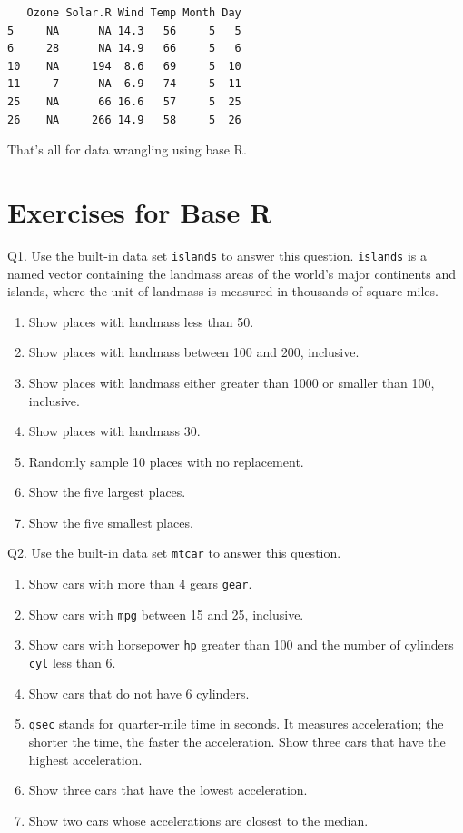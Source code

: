 \documentclass[
  letterpaper,
  DIV=11,
  numbers=noendperiod]{scrreprt}
\begin{document}
\begin{verbatim}
   Ozone Solar.R Wind Temp Month Day
5     NA      NA 14.3   56     5   5
6     28      NA 14.9   66     5   6
10    NA     194  8.6   69     5  10
11     7      NA  6.9   74     5  11
25    NA      66 16.6   57     5  25
26    NA     266 14.9   58     5  26
\end{verbatim}

That's all for data wrangling using base R.

\section{Exercises for Base R}\label{exercises-for-base-r}

Q1. Use the built-in data set \texttt{islands} to answer this question.
\texttt{islands} is a named vector containing the landmass areas of the
world's major continents and islands, where the unit of landmass is
measured in thousands of square miles.

\begin{enumerate}
\def\labelenumi{\alph{enumi}.}
\item
  Show places with landmass less than 50.
\item
  Show places with landmass between 100 and 200, inclusive.
\item
  Show places with landmass either greater than 1000 or smaller than
  100, inclusive.
\item
  Show places with landmass 30.
\item
  Randomly sample 10 places with no replacement.
\item
  Show the five largest places.
\item
  Show the five smallest places.
\end{enumerate}

Q2. Use the built-in data set \texttt{mtcar} to answer this question.

\begin{enumerate}
\def\labelenumi{\alph{enumi}.}
\item
  Show cars with more than 4 gears \texttt{gear}.
\item
  Show cars with \texttt{mpg} between 15 and 25, inclusive.
\item
  Show cars with horsepower \texttt{hp} greater than 100 and the number
  of cylinders \texttt{cyl} less than 6.
\item
  Show cars that do not have 6 cylinders.
\item
  \texttt{qsec} stands for quarter-mile time in seconds. It measures
  acceleration; the shorter the time, the faster the acceleration. Show
  three cars that have the highest acceleration.
\item
  Show three cars that have the lowest acceleration.
\item
  Show two cars whose accelerations are closest to the median.
\end{enumerate}
\end{document}

